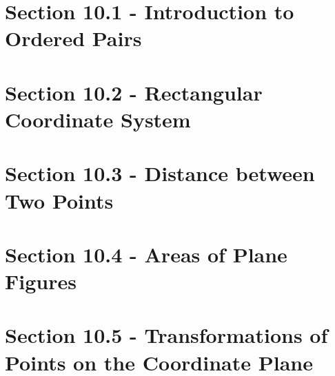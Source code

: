 \documentclass[12pt, a4paper]{article}
\begin{document}
\section*{Section 10.1 - Introduction to Ordered Pairs}\label{section:1-10-1}





\section*{Section 10.2 - Rectangular Coordinate System}\label{section:1-10-2}





\section*{Section 10.3 - Distance between Two Points}\label{section:1-10-3}





\section*{Section 10.4 - Areas of Plane Figures}\label{section:1-10-4}





\section*{Section 10.5 - Transformations of Points on the Coordinate Plane}\label{section:1-10-5}
\end{document}
